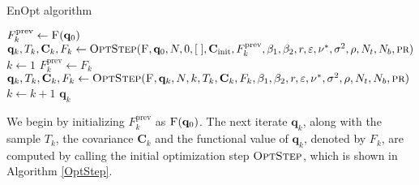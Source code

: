 \begin{algorithm}[H]%
\caption{\label{EnOptAlg}EnOpt algorithm}
\begin{algorithmic}[1]
\State \label{EnOptAlgFOMCall}$F^\mathrm{prev}_{k}\gets \Call{F}{\mathbf{q}_0}$
\State\label{EnOptAlgOptStepCall1} $\mathbf{q}_k,T_k,\mathbf{C}_k,F_k\gets\Call{OptStep}{\textproc{F},\mathbf{q}_0,N,0,[\;],\mathbf{C}_\mathrm{init},F^\mathrm{prev}_{k},\beta_1,\beta_2,r,\varepsilon,\nu^*,\sigma^2,\rho, N_t, N_b, \textproc{pr}}$
\State $k\gets 1$
\label{EnOptAlgBeginWhile}
\State $F^\mathrm{prev}_k\gets F_k$
\State\label{EnOptAlgOptStepCall2} $\mathbf{q}_{k},T_{k},\mathbf{C}_k,F_{k}\gets\Call{OptStep}{\textproc{F},\mathbf{q}_k,N,k,T_k,\mathbf{C}_k,F_k,\beta_1,\beta_2,r,\varepsilon,\nu^*,\sigma^2,\rho, N_t, N_b,\textproc{pr}}$
\State $k\gets k+1$
\EndWhile\label{EnOptAlgEndWhile}
\State \Return $\mathbf{q}_k$
\EndFunction
\end{algorithmic}
\end{algorithm}

We begin by initializing $F^\mathrm{prev}_{k}$ as $\Call{F}{\mathbf{q}_0}$. The next iterate $\mathbf{q}_k$, along with the sample $T_k$, the covariance $\mathbf{C}_k$ and the functional value of $\mathbf{q}_k$, denoted by $F_k$, are computed by calling the initial optimization step $\textproc{OptStep}$, which is shown in Algorithm \ref{OptStep}.

